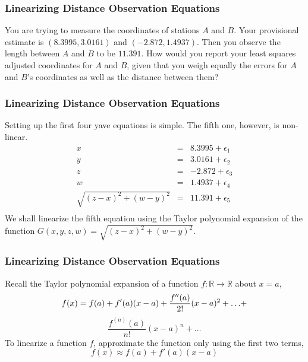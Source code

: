 \documentclass[xcolor=dvipsnames]{beamer}
\begin{document}
\begin{frame}
  \frametitle{Linearizing Distance Observation Equations}
   You are trying to measure the
  coordinates of stations $A$ and $B$. Your provisional estimate is
  $(8.3995,3.0161)$ and $(-2.872,1.4937)$. Then you observe the length
  between $A$ and $B$ to be $11.391$. How would you report your least
  squares adjusted coordinates for $A$ and $B$, given that you weigh
  equally the errors for $A$ and $B$'s coordinates as well as the
  distance between them?
\end{frame}

\begin{frame}
  \frametitle{Linearizing Distance Observation Equations}
  Setting up the first four yave equations is simple. The fifth one,
  however, is non-linear.
  \begin{equation}
    \label{eq:pheengei}
    \begin{array}{rcl}
      x&=&8.3995+\epsilon_{1} \\
      y&=&3.0161+\epsilon_{2} \\
      z&=&-2.872+\epsilon_{3} \\
      w&=&1.4937+\epsilon_{4} \\
      \sqrt{(z-x)^{2}+(w-y)^{2}}&=&11.391+\epsilon_{5} \\
    \end{array}
  \end{equation}
We shall linearize the fifth equation using the Taylor polynomial
expansion of the function $G(x,y,z,w)=\sqrt{(z-x)^{2}+(w-y)^{2}}$.
\end{frame}

\begin{frame}
  \frametitle{Linearizing Distance Observation Equations}
  Recall the Taylor polynomial expansion of a function
  $f:\mathbb{R}\rightarrow\mathbb{R}$ about $x=a$,
    \begin{equation}
      \label{eq:ahazohve}
      f(x)=f(a)+f'(a)(x-a)+\frac{f''(a)}{2!}(x-a)^{2}+{\ldots}+\notag
    \end{equation}
    \begin{equation}
      \label{eq:oolietai}
      \frac{f^{(n)}(a)}{n!}(x-a)^{n}+{\ldots}
    \end{equation}
To linearize a function $f$, approximate the function only using the
first two terms,
    \begin{equation}
      \label{eq:quaechun}
      f(x)\approx{}f(a)+f'(a)(x-a)
    \end{equation}
\end{frame}
\end{document}
